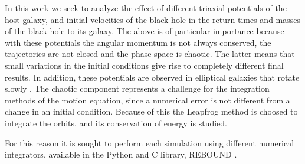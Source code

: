 	In this work we seek to analyze the effect of different triaxial potentials of the host galaxy, and initial velocities of the black hole in the return times and masses of the black hole to its galaxy. The above is of particular importance because with these potentials the angular momentum is not always conserved, the trajectories are not closed and the phase space is chaotic. The latter means that small variations in the initial conditions give rise to completely different final results. In addition, these potentials are observed in elliptical galaxies that rotate slowly \cite{buote2002chandra, binney1978elliptical}. The chaotic component represents a challenge for the integration methods of the motion equation, since a numerical error is not different from a change in an initial condition. Because of this the Leapfrog method is choosed to integrate the orbits, and its conservation of energy is studied.
	
	For this reason it is sought to perform each simulation using different numerical integrators, available in the Python and C library, REBOUND \cite{larson2017modeling}.
	
%	
